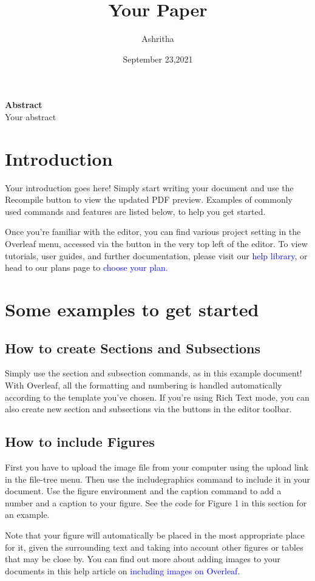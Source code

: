\documentclass{article}
\title{Your Paper}
\author{Ashritha}
\date{September 23,2021}
\begin{document}
 	
 	\maketitle
 	\textbf{Abstract}\\
 	Your abstract
 		
 	     \section{Introduction}
 	      Your introduction goes here! Simply start writing your document and use the Recompile button to
 	      view the updated PDF preview. Examples of commonly used commands and features are listed below,
 	      to help you get started.
 	      
 	      Once you’re familiar with the editor, you can find various project setting in the Overleaf menu,
 	      accessed via the button in the very top left of the editor. To view tutorials, user guides, and further
 	      documentation, please visit our \textcolor{blue}{ help library}, or head to our plans page to \textcolor{blue}{choose your plan.}
 	   \section{Some examples to get started}
 	   \subsection{How to create Sections and Subsections}
 	   Simply use the section and subsection commands, as in this example document! With Overleaf, all
 	   the formatting and numbering is handled automatically according to the template you’ve chosen. If
 	   you’re using Rich Text mode, you can also create new section and subsections via the buttons in the
 	   editor toolbar.
 	   \subsection{How to include Figures}
 	   First you have to upload the image file from your computer using the upload link in the file-tree menu.
 	   Then use the includegraphics command to include it in your document. Use the figure environment
 	   and the caption command to add a number and a caption to your figure. See the code for Figure 1 in
 	   this section for an example.
 	   
 	   Note that your figure will automatically be placed in the most appropriate place for it, given the
 	   surrounding text and taking into account other figures or tables that may be close by. You can find
 	   out more about adding images to your documents in this help article on \textcolor{blue}{including images on Overleaf.}
\end{document}
